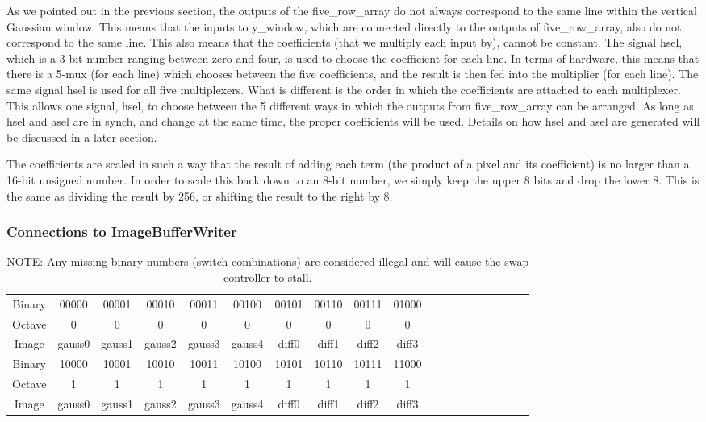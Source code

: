 As we pointed out in the previous section, the outputs of the five\_row\_array do 
not always correspond to the same line within the vertical Gaussian window. This 
means that the inputs to y\_window, which are connected directly to the outputs 
of five\_row\_array, also do not correspond to the same line. This also means that 
the coefficients (that we multiply each input by), cannot be constant. The 
signal hsel, which is a 3-bit number ranging between zero and four, is used to 
choose the coefficient for each line. In terms of hardware, this means that 
there is a 5-mux (for each line) which chooses between the five coefficients, 
and the result is then fed into the multiplier (for each line). The same signal 
hsel is used for all five multiplexers. What is different is the order in which 
the coefficients are attached to each multiplexer. This allows one signal, hsel, 
to choose between the 5 different ways in which the outputs from five\_row\_array 
can be arranged. As long as hsel and asel are in synch, and change at the same 
time, the proper coefficients will be used. Details on how hsel and asel are 
generated will be discussed in a later section.

The coefficients are scaled in such a way that the result of adding each term 
(the product of a pixel and its coefficient) is no larger than a 16-bit unsigned 
number. In order to scale this back down to an 8-bit number, we simply keep the 
upper 8 bits and drop the lower 8. This is the same as dividing the result by 
256, or shifting the result to the right by 8.

\subsubsection{Connections to ImageBufferWriter}

\begin{table}


    \begingroup
    \tiny
    \caption{ NOTE: Any missing binary numbers (switch combinations) are considered illegal 
and will cause the swap controller to stall.} \label{wrap-tab:1} 
\begin{tabular}{ c | c | c | c | c | c | c | c | c | c | c | c | c | c | c | c | c | c | c } 
Binary & 00000 & 00001 & 00010 & 00011 & 00100 & 00101 & 00110 & 00111 & 01000 \\ 
Octave & 0 & 0 & 0 & 0 & 0 & 0 & 0 & 0 & 0 \\
Image & gauss0 & gauss1 & gauss2 & gauss3 & gauss4 & diff0 & diff1 & diff2 & diff3 \\ \toprule
Binary & 10000 & 10001 & 10010 & 10011 & 10100 & 10101 & 10110 & 10111 & 11000 \\
Octave & 1 & 1 & 1 & 1 & 1 & 1 & 1 & 1 & 1 \\
Image & gauss0 & gauss1 & gauss2 & gauss3 & gauss4 & diff0 & diff1 & diff2 & diff3 \\
\end{tabular}
\endgroup 
\end{table}


